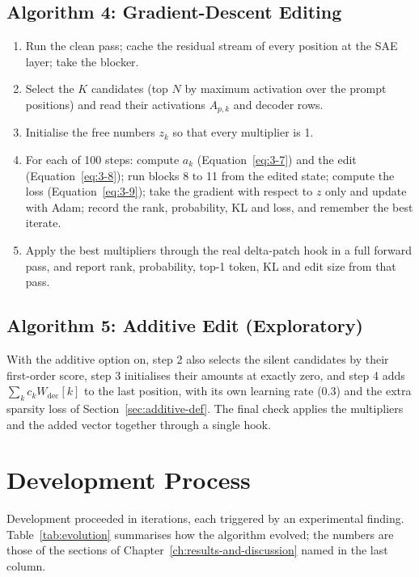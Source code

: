\documentclass[12pt,a4paper]{report}
\begin{document}
\subsection{Algorithm 4: Gradient-Descent Editing}

\begin{enumerate}
  \item Run the clean pass; cache the residual stream of every position at the SAE layer; take the blocker.
  \item Select the $K$ candidates (top $N$ by maximum activation over the prompt positions) and read their activations $A_{p,k}$ and decoder rows.
  \item Initialise the free numbers $z_k$ so that every multiplier is 1.
  \item For each of 100 steps: compute $a_k$ (Equation~\ref{eq:3-7}) and the edit (Equation~\ref{eq:3-8}); run blocks 8 to 11 from the edited state; compute the loss (Equation~\ref{eq:3-9}); take the gradient with respect to $z$ only and update with Adam; record the rank, probability, KL and loss, and remember the best iterate.
  \item Apply the best multipliers through the real delta-patch hook in a full forward pass, and report rank, probability, top-1 token, KL and edit size from that pass.
\end{enumerate}

\subsection{Algorithm 5: Additive Edit (Exploratory)}

With the additive option on, step 2 also selects the silent candidates by their first-order score, step 3 initialises their amounts at exactly zero, and step 4 adds $\sum_k c_k W_{\text{dec}}[k]$ to the last position, with its own learning rate (0.3) and the extra sparsity loss of Section~\ref{sec:additive-def}. The final check applies the multipliers and the added vector together through a single hook.

\section{Development Process}\label{sec:dev}

Development proceeded in iterations, each triggered by an experimental finding. Table~\ref{tab:evolution} summarises how the algorithm evolved; the numbers are those of the sections of Chapter~\ref{ch:results-and-discussion} named in the last column.
\end{document}
